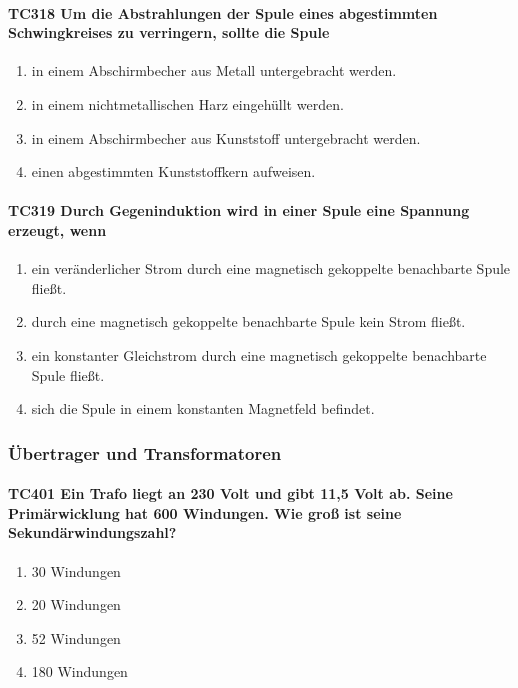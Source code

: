 \documentclass[8pt]{article}
\begin{document}
\begin{enumerate}
\begin{enumerate}[nolistsep,label=\Alph*]
{\paragraph*{TC318 Um die Abstrahlungen der Spule eines abgestimmten Schwingkreises zu verringern, sollte die Spule}
\begin{enumerate}[nolistsep,label=\Alph*]
\item in einem Abschirmbecher aus Metall untergebracht werden.
\item in einem nichtmetallischen Harz eingehüllt werden.
\item in einem Abschirmbecher aus Kunststoff untergebracht werden.
\item einen abgestimmten Kunststoffkern aufweisen.
\end{enumerate}

\paragraph*{TC319 Durch Gegeninduktion wird in einer Spule eine Spannung erzeugt, wenn}
\begin{enumerate}[nolistsep,label=\Alph*]
\item ein veränderlicher Strom durch eine magnetisch gekoppelte benachbarte Spule fließt.
\item durch eine magnetisch gekoppelte benachbarte Spule kein Strom fließt.
\item ein konstanter Gleichstrom durch eine magnetisch gekoppelte benachbarte Spule fließt.
\item sich die Spule in einem konstanten Magnetfeld befindet.
\end{enumerate}

\pagebreak
\subsubsection{Übertrager und Transformatoren}
\paragraph*{TC401 Ein Trafo liegt an 230 Volt und gibt 11,5 Volt ab. Seine Primärwicklung hat 600 Windungen. Wie groß ist seine Sekundärwindungszahl?}
\begin{enumerate}[nolistsep,label=\Alph*]
\item 30 Windungen
\item 20 Windungen
\item 52 Windungen
\item 180 Windungen
\end{enumerate}

}
\end{enumerate}
\end{enumerate}
\end{document}
